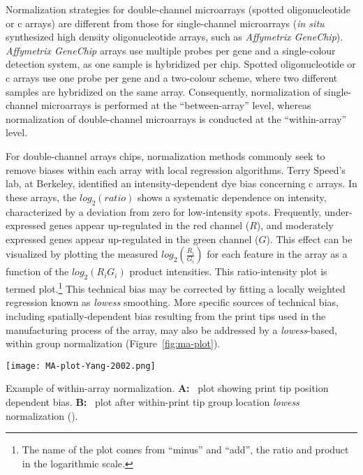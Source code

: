 Normalization strategies for double-channel microarrays (spotted oligonucleotide
or c arrays\cite{schena_quantitative_1995}) are different from
those for single-channel microarrays (\emph{in situ} synthesized high density
oligonucleotide arrays,\cite{lockhart_expression_1996} such as \emph{Affymetrix
  GeneChip}).  \emph{Affymetrix GeneChip} arrays use multiple probes per gene
and a single-colour detection system, as one sample is hybridized per chip.
Spotted oligonucleotide or c arrays use one probe per gene and a
two-colour scheme, where two different samples are hybridized on the same array.
Consequently, normalization of single-channel microarrays is performed at the
``between-array'' level, whereas normalization of double-channel microarrays is
conducted at the ``within-array'' level.\cite{do_normalization_2006}

For double-channel arrays chips, normalization methods commonly seek to remove
biases within each array with local regression algorithms.  Terry Speed's lab,
at Berkeley, identified an intensity-dependent dye bias concerning
c arrays.  In these arrays, the $log_{2} (ratio)$ shows a
systematic dependence on intensity, characterized by a deviation from zero for
low-intensity spots.  Frequently, under-expressed genes appear up-regulated in
the red channel ($R$), and moderately expressed genes appear up-regulated in the
green channel ($G$).
This effect can be visualized by plotting the measured
$log_{2}(\frac{R_{i}}{G_{i}})$ for each feature in the array as a function of
the $log_{2}(R_{i}G_{i})$ product intensities.  This ratio-intensity plot is
termed  plot.\footnote{The name of the plot comes from ``minus''
  and ``add'', the ratio and product in the logarithmic scale.}  This technical
bias may be corrected by fitting a locally weighted regression known as
\emph{lowess} smoothing.\cite{yang_normalization_2001} More specific sources of
technical bias, including spatially-dependent bias resulting from the print tips
used in the manufacturing process of the array, may also be addressed by a
\emph{lowess}-based, within group normalization (Figure~\ref{fig:ma-plot}).

\begin{marginfigure}%
  \begin{center}
    \texttt{[image: MA-plot-Yang-2002.png]}
    \caption[Within-array normalization]{Example of within-array normalization.
      \textbf{A:}~ plot showing print tip position dependent bias.
      \textbf{B:}~ plot after within-print tip group location
      \emph{lowess} normalization (\citealp{yang_normalization_2002}).}
    \label{fig:ma-plot}%
  \end{center}
\end{marginfigure}

